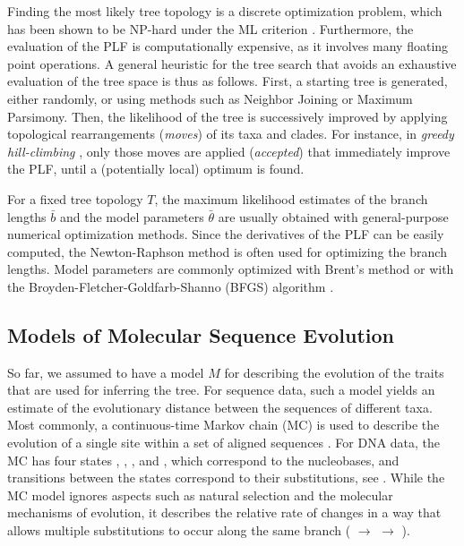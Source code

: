 Finding the most likely tree topology is a discrete optimization problem,
which has been shown to be NP-hard under the ML criterion \cite{Chor2005}.
Furthermore, the evaluation of the PLF is computationally expensive,
as it involves many floating point operations.
A general heuristic for the tree search that avoids an exhaustive evaluation of the tree space is thus as follows.
First, a starting tree is generated, either randomly, or using methods such as Neighbor Joining or Maximum Parsimony.
Then, the likelihood of the tree is successively improved
by applying topological rearrangements (\emph{moves}) of its taxa and clades.
For instance, in \emph{greedy hill-climbing} \cite{Stamatakis2014}, only those moves are applied (\emph{accepted})
that immediately improve the PLF, until a (potentially local) optimum is found.

For a fixed tree topology $T$, the maximum likelihood estimates
of the branch lengths $\bar{b}$ and the model parameters $\bar{\theta}$
are usually obtained with general-purpose numerical optimization methods.
Since the derivatives of the PLF can be easily computed,
the Newton-Raphson method \cite{Ypma1995} is often used for optimizing the branch lengths.
Model parameters are commonly optimized with Brent's method \cite{Brent1971}
or with the Broyden-Fletcher-Goldfarb-Shanno (BFGS) algorithm \cite{Fletcher1987}.


\subsection{Models of Molecular Sequence Evolution}
\label{ch:Foundations:sec:MLTreeInference:sub:ModelsOfSeqEvol}

So far, we assumed to have a model $M$ for describing the evolution of the traits that are used for inferring the tree.
For sequence data, such a model yields an estimate of the evolutionary distance between the sequences of different taxa.
Most commonly, a continuous-time Markov chain (MC) is used to describe
the evolution of a single site within a set of aligned sequences \cite{Gagniuc2017}.
For DNA data, the MC has four states , , , and ,
which correspond to the nucleobases, and transitions between the states correspond to their substitutions,
see .
While the MC model ignores aspects such as natural selection and the molecular mechanisms of evolution,
it describes the relative rate of changes in a way that allows multiple substitutions to occur
along the same branch ( $\rightarrow$  $\rightarrow$ ).

